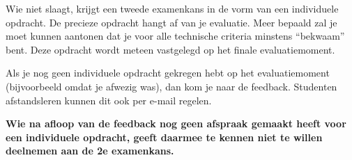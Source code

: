 Wie niet slaagt, krijgt een tweede examenkans in de vorm van een individuele opdracht. De precieze opdracht hangt af van je evaluatie. Meer bepaald zal je moet kunnen aantonen dat je voor alle technische criteria minstens ``bekwaam'' bent. Deze opdracht wordt meteen vastgelegd op het finale evaluatiemoment.

Als je nog geen individuele opdracht gekregen hebt op het evaluatiemoment (bijvoorbeeld omdat je afwezig was), dan kom je naar de feedback. Studenten afstandsleren kunnen dit ook per e-mail regelen.

\textbf{Wie na afloop van de feedback nog geen afspraak gemaakt heeft voor een individuele opdracht, geeft daarmee te kennen niet te willen deelnemen aan de 2e examenkans.}